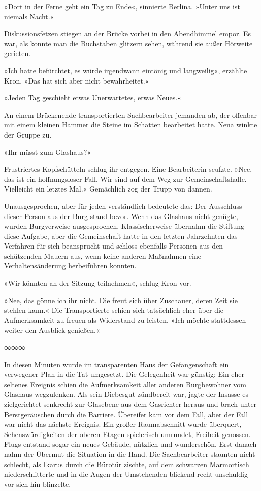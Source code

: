 »Dort in der Ferne geht ein Tag zu Ende«, sinnierte Berlina. »Unter uns ist niemals Nacht.«

Diskussionsfetzen stiegen an der Brücke vorbei in den Abendhimmel empor. Es war, als konnte man die Buchstaben glitzern sehen, während sie außer Hörweite gerieten.

»Ich hatte befürchtet, es würde irgendwann eintönig und langweilig«, erzählte Kron. »Das hat sich aber nicht bewahrheitet.«

»Jeden Tag geschieht etwas Unerwartetes, etwas Neues.«

An einem Brückenende transportierten Sachbearbeiter jemanden ab, der offenbar mit einem kleinen Hammer die Steine im Schatten bearbeitet hatte. Nena winkte der Gruppe zu.

»Ihr müsst zum Glashaus?«

Frustriertes Kopfschütteln schlug ihr entgegen. Eine Bearbeiterin seufzte. »Nee, das ist ein hoffnungsloser Fall. Wir sind auf dem Weg zur Gemeinschaftshalle. Vielleicht ein letztes Mal.« Gemächlich zog der Trupp von dannen.

Unausgesprochen, aber für jeden verständlich bedeutete das: Der Ausschluss dieser Person aus der Burg stand bevor. Wenn das Glashaus nicht genügte, wurden Burgverweise ausgesprochen. Klassischerweise übernahm die Stiftung diese Aufgabe, aber die Gemeinschaft hatte in den letzten Jahrzehnten das Verfahren für sich beansprucht und schloss ebenfalls Personen aus den schützenden Mauern aus, wenn keine anderen Maßnahmen eine Verhaltensänderung herbeiführen konnten.

»Wir könnten an der Sitzung teilnehmen«, schlug Kron vor.

»Nee, das gönne ich ihr nicht. Die freut sich über Zuschauer, deren Zeit sie stehlen kann.« Die Transportierte schien sich tatsächlich eher über die Aufmerksamkeit zu freuen als Widerstand zu leisten. »Ich möchte stattdessen weiter den Ausblick genießen.«

\begin{center}
∞∞∞
\end{center}

In diesen Minuten wurde im transparenten Haus der Gefangenschaft ein verwegener Plan in die Tat umgesetzt. Die Gelegenheit war günstig: Ein eher seltenes Ereignis schien die Aufmerksamkeit aller anderen Burgbewohner vom Glashaus wegzulenken. Als sein Diebesgut zündbereit war, jagte der Insasse es zielgerichtet senkrecht zur Glasebene aus dem Gasrichter heraus und brach unter Berstgeräuschen durch die Barriere. Übereifer kam vor dem Fall, aber der Fall war nicht das nächste Ereignis. Ein großer Raumabschnitt wurde überquert, Sehenswürdigkeiten der oberen Etagen spielerisch umrundet, Freiheit genossen. Flugs entstand sogar ein neues Gebäude, nützlich und wunderschön. Erst danach nahm der Übermut die Situation in die Hand. Die Sachbearbeiter staunten nicht schlecht, als Ikarus durch die Bürotür zischte, auf dem schwarzen Marmortisch niederschlitterte und in die Augen der Umstehenden blickend recht unschuldig vor sich hin blinzelte.

